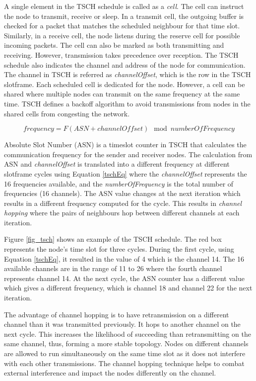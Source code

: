 A single element in the TSCH schedule is called as a \textit{cell}. The cell can instruct the node to transmit, receive or sleep. In a transmit cell, the outgoing buffer is checked for a packet that matches the scheduled neighbour for that time slot. Similarly, in a receive cell, the node listens during the reserve cell for possible incoming packets. The cell can also be marked as both transmitting and receiving. However, transmission takes precedence over reception. The TSCH schedule also indicates the channel and address of the node for communication. The channel in TSCH is referred as \textit{channelOffset}, which is the row in the TSCH slotframe. Each scheduled cell is dedicated for the node. However, a cell can be shared where multiple nodes can transmit on the same frequency at the same time. TSCH defines a backoff algorithm to avoid transmissions from nodes in the shared cells from congesting the network.

\begin{equation}
frequency = F {(ASN + channelOffset) \mod {numberOfFrequency}}
\label{tschEq}
\end{equation}

Absolute Slot Number (ASN) is a timeslot counter in TSCH that calculates the communication frequency for the sender and receiver nodes. The calculation from ASN and \textit{channelOffset} is translated into a different frequency at different slotframe cycles using Equation \ref{tschEq} where the \textit{channelOffset} represents the 16 frequencies available, and the \textit{numberOfFrequency} is the total number of frequencies (16 channels). The ASN value changes at the next iteration which results in a different frequency computed for the cycle. This results in \textit{channel hopping} where the pairs of neighbours hop between different channels at each iteration.

Figure \ref{fig_tsch} shows an example of the TSCH schedule. The red box represents the node's time slot for three cycles. During the first cycle, using Equation \ref{tschEq}, it resulted in the value of 4 which is the channel 14. The 16 available channels are in the range of 11 to 26 where the fourth channel represents channel 14. At the next cycle, the ASN counter has a different value which gives a different frequency, which is channel 18 and channel 22 for the next iteration.

The advantage of channel hopping is to have retransmission on a different channel than it was transmitted previously. It hops to another channel on the next cycle. This increases the likelihood of succeeding than retransmitting on the same channel, thus, forming a more stable topology. Nodes on different channels are allowed to run simultaneously on the same time slot as it does not interfere with each other transmissions. The channel hopping technique helps to combat external interference and impact the nodes differently on the channel.

